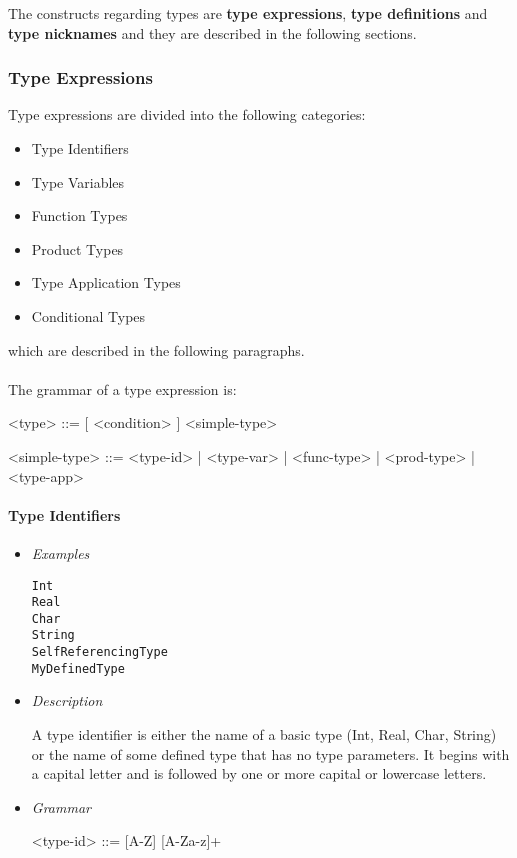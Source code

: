 \documentclass{article}
\begin{document}
The constructs regarding types are \textbf{type expressions}, \textbf{type
definitions} and \textbf{type nicknames} and they are described in the
following sections.

\subsubsection{Type Expressions}

Type expressions are divided into the following categories:
\begin{itemize}
\item Type Identifiers
\item Type Variables
\item Function Types
\item Product Types
\item Type Application Types
\item Conditional Types
\end{itemize}
which are described in the following paragraphs.
\\\\
The grammar of a type expression is:
\begin{grammar}
<type> ::= [ <condition> ]  <simple-type> 

<simple-type> ::= <type-id> | <type-var> | <func-type> | <prod-type> | <type-app>
\\
\end{grammar}
\paragraph{Type Identifiers}

\begin{itemize}
\item \textit{Examples}
\begin{verbatim}
Int
Real 
Char 
String
SelfReferencingType
MyDefinedType
\end{verbatim}

\item \textit{Description}

A type identifier is either the name of a basic type (Int, Real, Char, String) or
the name of some defined type that has no type parameters. It begins with a capital
letter and is followed by one or more capital or lowercase letters.

\item \textit{Grammar}
\begin{grammar}
<type-id> ::= [A-Z] [A-Za-z]+ \\ 
\end{grammar}
\end{itemize}
\end{document}
